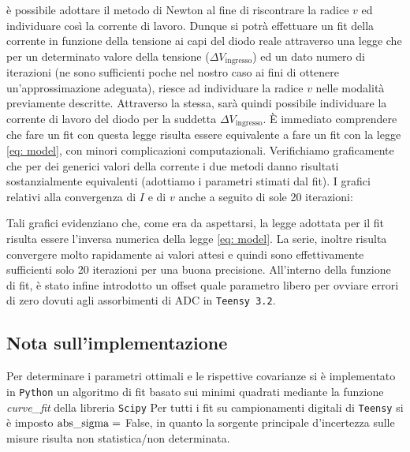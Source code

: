 \documentclass{article}[a4paper, oneside, 11pt]
\begin{document}
è possibile adottare il metodo di Newton al fine di riscontrare la radice $v$
ed individuare così la corrente di lavoro. 
Dunque si potrà effettuare un fit della corrente in funzione della tensione ai 
capi del diodo reale attraverso una legge che per un determinato valore della 
tensione ($\Delta V_{\text{ingresso}}$) ed un dato numero di iterazioni (ne 
sono sufficienti poche nel nostro caso ai fini di ottenere un’approssimazione 
adeguata), riesce ad individuare la radice $v$ nelle modalità previamente 
descritte. Attraverso la stessa, sarà quindi possibile individuare la corrente 
di lavoro del diodo per la suddetta $\Delta V_{\text{ingresso}}$. 
\`E immediato comprendere che fare un fit con questa legge risulta essere 
equivalente a fare un fit con la legge \eqref{eq: model}, con minori complicazioni 
computazionali. Verifichiamo graficamente che per dei generici valori della 
corrente i due metodi danno risultati sostanzialmente equivalenti (adottiamo i 
parametri stimati dal fit). I grafici relativi alla convergenza di $I$ e di $v$ 
anche a seguito di sole 20 iterazioni:
\begin{figure}[H]
	\centering 
	\def\svgwidth{\columnwidth}
		\scalebox{0.75}{}
\end{figure}
\begin{figure}[H]
	\centering 
		\scalebox{0.75}{}
\end{figure}
Tali grafici evidenziano che, come era da aspettarsi, la legge adottata per il 
fit risulta essere l’inversa numerica della legge \eqref{eq: model}. La serie,
inoltre risulta convergere molto rapidamente ai valori attesi e quindi sono 
effettivamente sufficienti solo 20 iterazioni per una buona precisione.
All’interno della funzione di fit, è stato infine introdotto un offset quale
parametro libero per ovviare errori di zero dovuti agli assorbimenti di ADC
in \verb+Teensy 3.2+.

\subsection*{Nota sull'implementazione}
Per determinare i parametri ottimali e le rispettive covarianze si \`e
implementato in \verb+Python+ un algoritmo di fit basato sui minimi quadrati
mediante la funzione \emph{curve\_fit} della libreria \texttt{Scipy}\cite{scipy}
Per tutti i fit su campionamenti digitali di \verb+Teensy+ si è imposto
$\rm{abs\_sigma} =$ False, in quanto la sorgente principale d'incertezza
sulle misure risulta non statistica/non determinata.


\medskip


\end{document}

